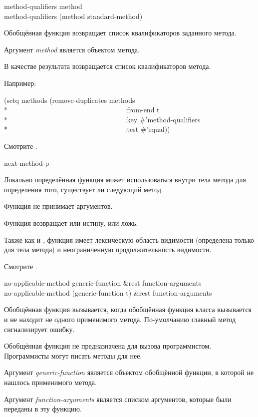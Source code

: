 \begin{defun}
method-qualifiers method \\
method-qualifiers (method standard-method)

Обобщённая функция  возвращает список квалификаторов
заданного метода.

Аргумент \emph{method} является объектом метода.

В качестве результата возвращается список квалификаторов метода.

Например:
\begin{lisp}
(setq methods (remove-duplicates methods \\*
~~~~~~~~~~~~~~~~~~~~~~~~~~~~~~~~~:from-end t \\*
~~~~~~~~~~~~~~~~~~~~~~~~~~~~~~~~~:key \#'method-qualifiers \\*
~~~~~~~~~~~~~~~~~~~~~~~~~~~~~~~~~:test \#'equal))
\end{lisp}

Смотрите .
\end{defun}

\begin{defun}[Функция]
next-method-p

Локально определённая функция  может использоваться внутри
тела метода для определения того, существует ли следующий метод.

Функция  не принимает аргументов.

Функция  возвращает или истину, или ложь.

Также как и , функция  имеет
лексическую область видимости (определена только для тела метода) и
неограниченную продолжительность видимости.

Смотрите .
\end{defun}

\begin{defun}
no-applicable-method generic-function &rest function-arguments \\
no-applicable-method (generic-function t) &rest function-arguments

Обобщённая функция  вызывается, когда обобщённая
функция класса  вызывается и не находит не одного
применимого метода. По-умолчанию главный метод сигнализирует ошибку.

Обобщённая функция  не предназначена для вызова
программистом. Программисты могут писать методы для неё.

Аргумент \emph{generic-function} является объектом обобщённой функции, в которой
не нашлось применимого метода.

Аргумент \emph{function-arguments} является списком аргументов, которые были
переданы в эту функцию.
\end{defun}

